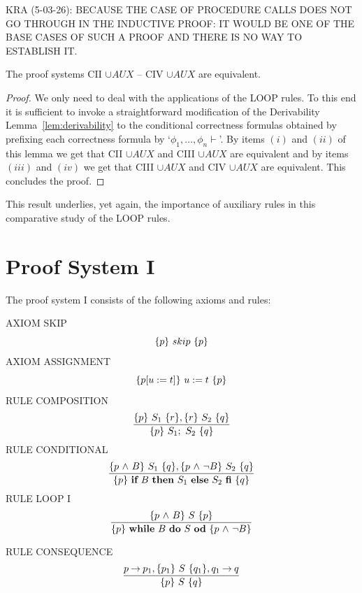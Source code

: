 \documentclass[runningheads]{llncs}       %
\newcommand{\AUX}{\mathit{AUX}}
\begin{document}
KRA (5-03-26): BECAUSE THE CASE OF PROCEDURE CALLS DOES NOT GO THROUGH
IN THE INDUCTIVE PROOF: IT WOULD BE ONE OF THE BASE CASES OF SUCH A
PROOF AND THERE IS NO WAY TO ESTABLISH IT.

\begin{theorem} \label{thm:main2}
  The proof systems CII $\cup \AUX$ -- CIV $\cup \AUX$  are equivalent.  
\end{theorem}

\begin{proof}
  We only need to deal with the applications of the LOOP rules. To this end it
  is sufficient to invoke a straightforward modification of the
  Derivability Lemma~\ref{lem:derivability} to the conditional
  correctness formulas obtained by prefixing each correctness formula
  by `$\phi_1, \dots, \phi_n \vdash$'.  By items $(i)$ and $(ii)$ of
  this lemma we get that CII $\cup \AUX$ and CIII $\cup \AUX$ are
  equivalent and by items $(iii)$ and $(iv)$ we get that CIII
  $\cup \AUX$ and CIV $\cup \AUX$ are equivalent. This concludes the
  proof.
  \HB
\end{proof}

This result underlies, yet again, the importance of auxiliary rules in this comparative study of
the LOOP rules.




\appendix

\section{Proof System I}
\label{sec:I}

The proof system I consists of the following axioms and rules:
\VV

\NI
AXIOM \label{rul:skip} SKIP
\[ \mbox{$\{{p}\}\ {skip}\ \{{p}\}$} \]
%
\NI
AXIOM \label{rul:assi} ASSIGNMENT
\[ \mbox{$\{{p[u:=t]}\}\ {u:=t}\ \{{p}\}$} \]
%
\NI
RULE \label{rul:comp} COMPOSITION
\[ \frac{ \mbox{$\{{p}\}\ {S_1}\ \{{r}\}$}, \mbox{$\{{r}\}\ {S_2}\ \{{q}\}$}                }
        { \mbox{$\{{p}\}\ {S_1;\ S_2}\ \{{q}\}$}                          }\]
%
\NI
RULE \label{rul:cond} CONDITIONAL
\[ \frac{ \mbox{$\{{p \mbox{$\ \wedge\ $} B}\}\ {S_1}\ \{{q}\}$}, \mbox{$\{{p \mbox{$\ \wedge\ $} \neg B}\}\ {S_2}\ \{{q}\}$}         }
        { \mbox{$\{{p}\}\ {\mbox{$\mbox{{\bf if}\ } {B} \mbox{\ {\bf then}\ } {S_1} \mbox{\ {\bf else}\ } {S_2}\ \mbox{{\bf fi}}$}}\ \{{q}\}$}                          }\]
%
\NI
RULE \label{rul:loop} LOOP I
\[ \frac{ \mbox{$\{{p \mbox{$\ \wedge\ $} B}\}\ {S}\ \{{p}\}$}                             }
        { \mbox{$\{{p}\}\ {\mbox{$\mbox{{\bf while}\ } {B}\ \mbox{{\bf do}\ } {S}\ \mbox{{\bf od}}$}}\ \{{p \mbox{$\ \wedge\ $} \neg B}\}$}               }\]
%

\NI
RULE \label{rul:cons} CONSEQUENCE
\[ \frac{ p \mbox{$\:\rightarrow\:$} p_1, \mbox{$\{{p_1}\}\ {S}\ \{{q_1}\}$}, q_1 \mbox{$\:\rightarrow\:$} q        }
        { \mbox{$\{{p}\}\ {S}\ \{{q}\}$}                                  }\]
%
\end{document}
